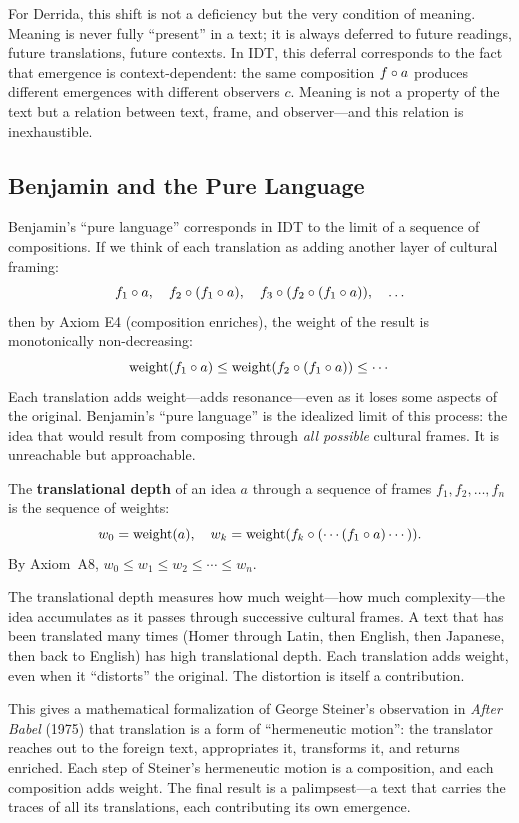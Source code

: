 For Derrida, this shift is not a deficiency but the very condition of meaning.
Meaning is never fully ``present'' in a text; it is always deferred to future
readings, future translations, future contexts.  In IDT, this deferral
corresponds to the fact that emergence is context-dependent: the same
composition $f \circ a$ produces different emergences with different
observers $c$.  Meaning is not a property of the text but a relation between
text, frame, and observer---and this relation is inexhaustible.

\subsection{Benjamin and the Pure Language}

Benjamin's ``pure language'' corresponds in IDT to the limit of a sequence
of compositions.  If we think of each translation as adding another layer
of cultural framing:
\[
f_1 \circ a, \quad f_2 \circ (f_1 \circ a), \quad
f_3 \circ (f_2 \circ (f_1 \circ a)), \quad \ldots
\]
then by Axiom E4 (composition enriches), the weight of the result is
monotonically non-decreasing:
\[
\mathrm{weight}(f_1 \circ a) \leq
\mathrm{weight}(f_2 \circ (f_1 \circ a)) \leq \cdots
\]
Each translation adds weight---adds resonance---even as it loses some
aspects of the original.  Benjamin's ``pure language'' is the idealized
limit of this process: the idea that would result from composing through
\emph{all possible} cultural frames.  It is unreachable but approachable.

\begin{definition}
\label{def:translational-depth}
The \textbf{translational depth} of an idea $a$ through a sequence of frames
$f_1, f_2, \ldots, f_n$ is the sequence of weights:
\[
w_0 = \mathrm{weight}(a), \quad
w_k = \mathrm{weight}(f_k \circ (\cdots (f_1 \circ a) \cdots)).
\]
By Axiom~A8, $w_0 \leq w_1 \leq w_2 \leq \cdots \leq w_n$.
\end{definition}

The translational depth measures how much weight---how much complexity---the
idea accumulates as it passes through successive cultural frames.  A text
that has been translated many times (Homer through Latin, then English, then
Japanese, then back to English) has high translational depth.  Each translation
adds weight, even when it ``distorts'' the original.  The distortion is itself
a contribution.

This gives a mathematical formalization of George Steiner's observation in
\textit{After Babel} (1975) that translation is a form of ``hermeneutic
motion'': the translator reaches out to the foreign text, appropriates it,
transforms it, and returns enriched.  Each step of Steiner's hermeneutic
motion is a composition, and each composition adds weight.  The final
result is a palimpsest---a text that carries the traces of all its
translations, each contributing its own emergence.

